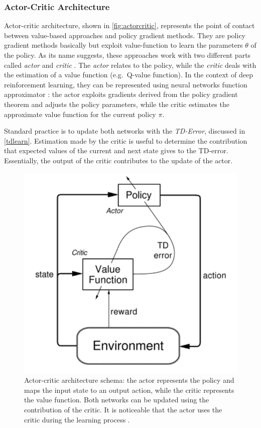 \subsubsection{Actor-Critic Architecture}

Actor-critic architecture, shown in \vref{fig:actorcritic}, represents the point of contact between value-based approaches and policy gradient methods.
They are policy gradient methods basically but exploit value-function to learn the parameters $\theta$ of the policy.
As its name suggests, these approaches work with two different parts called \textit{actor} and \textit{critic} \cite{konda2000actor}.
The \textit{actor} relates to the policy, while the \textit{critic} deals with the estimation of a value function (e.g.\ Q-value function).
In the context of deep reinforcement learning, they can be represented using neural networks function approximator \cite{mnih2016asynchronous}: the actor exploits gradients derived from the policy gradient theorem and adjusts the policy parameters, while the critic estimates the approximate value function for the current policy $\pi$.

Standard practice is to update both networks with the \textit{TD-Error}, discussed in \vref{tdlearn}.
Estimation made by the critic is useful to determine the contribution that expected values of the current and next state gives to the TD-error.
Essentially, the output of the critic contributes to the update of the actor.


\begin{figure}[!h]
	\centering
	\includegraphics[height=0.4\textwidth]{img/actorcritic.png}
	\caption[Actor-Critic architecture schema]{Actor-critic architecture schema: the actor represents the policy and maps the input state to an output action, while the critic represents the value function.
		Both networks can be updated using the contribution of the critic.
		It is noticeable that the actor uses the critic during the learning process \cite{sutton2018reinforcement}.}
	\label{fig:actorcritic}
\end{figure}

